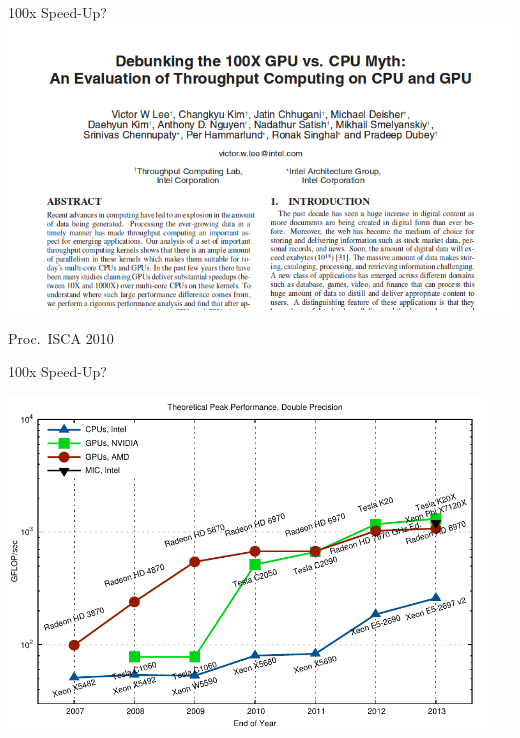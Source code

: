 



\begin{frame}{100x Speed-Up?}
 \includegraphics[width=\textwidth]{figures/debunking-100x}
 \begin{center} \vspace*{0.5cm} \small Proc.~ISCA 2010 \end{center}
\end{frame}


\begin{frame}{100x Speed-Up?}
 \begin{center} \includegraphics[width=0.95\textwidth]{figures/gflops-dp} \end{center}
\end{frame}

